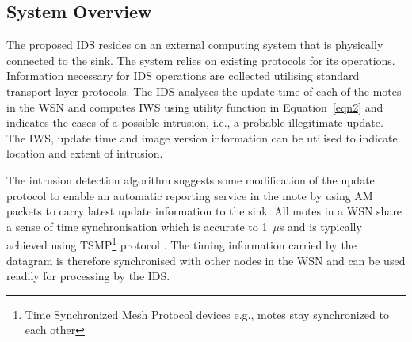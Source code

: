 \documentclass[conference,final]{IEEEtran}
\newcommand{\notedme}[1]{\raisebox{0pt}[0pt][0pt]{\pdfcomment[open=true,color=blue]{#1}}}
\begin{document}



\subsection*{System Overview}
\label{subsec:sysdeg}
The proposed IDS resides on an external computing system that is physically connected to the sink.
The system  relies on existing protocols for its operations.
Information necessary for IDS operations are collected utilising standard transport layer protocols. 
The IDS analyses the update time of  each of the motes in the WSN and computes IWS using utility function in Equation~\ref{eqn2} and indicates the cases of a possible intrusion, i.e., a probable illegitimate update.
The IWS, update time and image version information can be utilised to indicate location and extent of intrusion. 

The intrusion detection algorithm suggests some modification of the update protocol to enable an automatic reporting service in the mote by using AM packets to carry latest update information to the sink.
All motes in a WSN share a sense of time synchronisation which is accurate to 1~$\mu$s  and  is typically achieved using  TSMP\footnote{Time Synchronized Mesh Protocol devices e.g., motes stay synchronized to each other} protocol \cite{Pister08tsmp:time}.
The timing information carried by the datagram is therefore synchronised with other nodes in the WSN and can be used readily for processing by the IDS.
\end{document}
